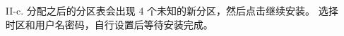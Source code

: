 \begin{itemize}
\begin{itemize}
\begin{figure}[htbp]
{					}
					\hfill
					\hfill
					\hfill
				    \hfill
					\label{fig:setting}
				\end{figure}
			\item [II-c.] 分配之后的分区表会出现 4 个未知的新分区，然后点击继续安装。
				选择时区和用户名密码，自行设置后等待安装完成。
		\end{itemize}
\end{itemize}



